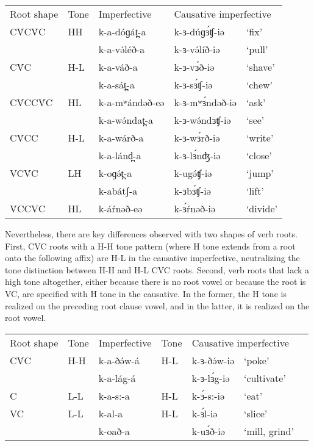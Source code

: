 \ea	
\begin{tabular}[t]{lllll}
Root shape&	Tone  & Imperfective	& \multicolumn{2}{l}{Causative imperfective}\\
CV́CV́C	&	HH	&	k-a-dóɡát̪-a	&	k-ɜ-dúɡɜ́ʧ-iə	&	‘fix’\\
 	 	&		&	k-a-və́léð-a	&	k-ɜ-və́líð-iə		&	‘pull’\\
CV́C		&	H-L	&	k-a-váð-a	&	k-ɜ-vɜ́ð-iə		&	‘shave’\\
	 	&		&	k-a-sát̪-a	&	k-ɜ-sɜ́ʧ-iə		&	‘chew’\\
CV́CCV́C	&	HL	&	k-a-mʷándəð-eə&	k-ɜ-mʷɜ́ndəð-iə	&	‘ask’\\
 		&		&	k-a-wə́ndat̪-a	&	k-ɜ-wə́ndɜʧ-iə	&	‘see’\\
CV́CC	&	H-L	&	k-a-wárð-a	&	k-ɜ-wɜ́rð-iə		&	‘write’\\
		&		&	k-a-lánd̪-a	&	k-ɜ-lɜ́nʤ-iə		&	‘close’\\
VCV́C	&	LH	&	k-oɡə́t̪-a		&	k-ugə́ʧ-iə		&	‘jump’\\
		&		&	k-abátʃ-a	&	k-ɜbɜ́ʧ-iə		&	‘lift’\\
V́CCVC	&	HL	&	k-áŕnəð-eə	&	k-ɜ́ŕnəð-iə		&	‘divide’\\	
\end{tabular}
\z

Nevertheless, there are key differences observed with two shapes of verb roots. First, CVC roots with a H-H tone pattern (where H tone extends from a root onto the following affix) are H-L in the causative imperfective, neutralizing the tone distinction between H-H and H-L CVC roots. Second, verb roots that lack a high tone altogether, either because there is no root vowel or because the root is VC, are specified with H tone in the causative. In the former, the H tone is realized on the preceding root clause vowel, and in the latter, it is realized on the root vowel. 

\ea	       	
\begin{tabular}[t]{lllllll}
Root shape	&	Tone&	Imperfective	&	Tone	&	\multicolumn{2}{l}{Causative imperfective}	\\
CV́C			&	H-H	&	k-a-ðə́w-á		&	H-L	&	k-ɜ-ðə́w-iə	&	‘poke’\\
	& 	&	k-a-lág-á	&		&	k-ɜ-lɜ́g-iə	&	‘cultivate’\\
C			&	L-L	&	k-a-s:-a		&	H-L	&	k-ɜ́-s:-iə	&	‘eat’\\
VC			&	L-L	&	k-al-a		&	H-L	&	k-ɜ́l-iə		&	‘slice’\\
	&		&	k-oað-a		&		&	k-uɜ́ð-iə	&	‘mill, grind’\\	
\end{tabular}
\z

